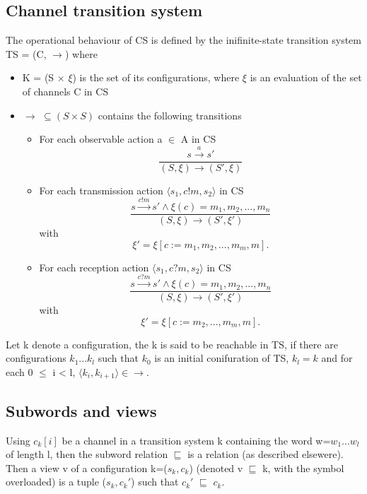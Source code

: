 \subsection{Channel transition system}
The operational behaviour of CS is defined by the inifinite-state transition system TS = (C, $\rightarrow$) where
\begin{itemize}
\item[]
   K = (S $\times$ $\xi$) is the set of its configurations, where $\xi$ is an evaluation of the set of channels C in CS
\item[]
  $\rightarrow$ $\subseteq (S \times S)$ contains the following transitions
  \begin{itemize}
    \item
      For each observable action a $\in$ A in CS
      \[
      \dfrac{s \xrightarrow{a} s'}{(S, \xi) \rightarrow (S', \xi)}
      \]
    \item
      For each transmission action $\langle s_1, c!m, s_2 \rangle$ in CS
      \[
      \dfrac{s \xrightarrow{c!m} s' \wedge \xi(c) = m_1,m_2,...,m_n}{(S, \xi) \rightarrow (S', \xi')} \] with \[ \xi' = \xi[c := m_1,m_2,...,m_m,m].
      \]
    \item
      For each reception action $\langle s_1, c?m, s_2 \rangle$ in CS
      \[
      \dfrac{s \xrightarrow{c?m} s' \wedge \xi(c) = m_1,m_2,...,m_n}{(S, \xi) \rightarrow (S', \xi')} \] with \[ \xi' = \xi[c := m_2,...,m_m,m].
      \]

  \end{itemize}
\end{itemize}

Let k denote a configuration, the k is said to be reachable in TS, if there are configurations $k_1...k_l$ such that $k_0$ is an initial conifuration of TS, $k_l = k$ and for each 0 $\leq$ i < l, $\langle k_i, k_{i+1} \rangle \in \rightarrow$.

\newpage

\subsection{Subwords and views}

Using $c_k[i]$ be a channel in a transition system k containing the word w=$w_1...w_l$ of length l, then the subword relation $\sqsubseteq$ is a relation (as described elsewere). Then a view v of a configuration k=($s_k,c_k$) (denoted v $\sqsubseteq$ k, with the symbol overloaded) is a tuple ($s_k, c_k'$) such that $c_k'$ $\sqsubseteq$ $c_k$.

